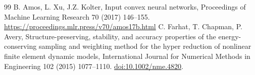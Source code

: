 \documentclass[10pt,a4paper]{article}
\newcommand{\doi}[1]{\href{https://doi.org/#1}{doi:#1}.}
\begin{document}
\begin{thebibliography}{99}
 B. Amos, L. Xu, J.Z. Kolter, Input convex neural networks, Proceedings of Machine Learning Research 70 (2017) 146--155. \url{https://proceedings.mlr.press/v70/amos17b.html}
 C. Farhat, T. Chapman, P. Avery, Structure-preserving, stability, and accuracy properties of the energy-conserving sampling and weighting method for the hyper reduction of nonlinear finite element dynamic models, International Journal for Numerical Methods in Engineering 102 (2015) 1077--1110. \doi{10.1002/nme.4820}
\end{thebibliography}
\end{document}
